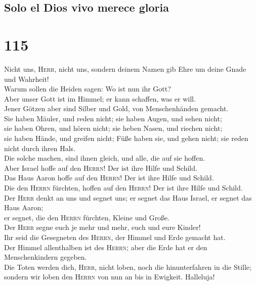 \hypertarget{solo-el-dios-vivo-merece-gloria}{%
\subsection{Solo el Dios vivo merece
gloria}\label{solo-el-dios-vivo-merece-gloria}}

\hypertarget{section-114}{%
\section{115}\label{section-114}}

 Nicht uns, \textsc{Herr}, nicht uns, sondern deinem Namen
gib Ehre um deine Gnade und Wahrheit!\\
 Warum sollen die Heiden sagen: Wo ist nun ihr Gott?\\
 Aber unser Gott ist im Himmel; er kann schaffen, was er
will.\\
 Jener Götzen aber sind Silber und Gold, von
Menschenhänden gemacht.\\
 Sie haben Mäuler, und reden nicht; sie haben Augen, und
sehen nicht;\\
 sie haben Ohren, und hören nicht; sie heben Nasen, und
riechen nicht;\\
 sie haben Hände, und greifen nicht; Füße haben sie, und
gehen nicht; sie reden nicht durch ihren Hals.\\
 Die solche machen, sind ihnen gleich, und alle, die auf
sie hoffen.\\
 Aber Israel hoffe auf den \textsc{Herrn}! Der ist ihre
Hilfe und Schild.\\
 Das Haus Aaron hoffe auf den \textsc{Herrn}! Der ist
ihre Hilfe und Schild.\\
 Die den \textsc{Herrn} fürchten, hoffen auf den
\textsc{Herrn}! Der ist ihre Hilfe und Schild.\\
 Der \textsc{Herr} denkt an uns und segnet uns; er segnet
das Haus Israel, er segnet das Haus Aaron;\\
 er segnet, die den \textsc{Herrn} fürchten, Kleine und
Große.\\
 Der \textsc{Herr} segne euch je mehr und mehr, euch und
eure Kinder!\\
 Ihr seid die Gesegneten des \textsc{Herrn}, der Himmel
und Erde gemacht hat.\\
 Der Himmel allenthalben ist des \textsc{Herrn}; aber die
Erde hat er den Menschenkindern gegeben.\\
 Die Toten werden dich, \textsc{Herr}, nicht loben, noch
die hinunterfahren in die Stille;\\
 sondern wir loben den \textsc{Herrn} von nun an bis in
Ewigkeit. Halleluja!

